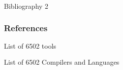 \documentclass{beamer}
\begin{document}
\begin{frame}{Bibliography 2}
  \frametitle{References}

  \begin{thebibliography}{6502 Assemblers}
    List of 6502 tools

    List of 6502 Compilers and Languages
  \end{thebibliography}
\end{frame}
\end{document}
